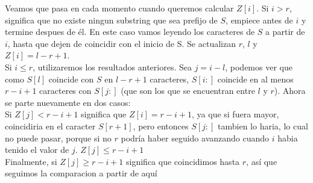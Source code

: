 \documentclass[a4paper]{article}
\begin{document}
Veamos que pasa en cada momento cuando queremos calcular $Z[i]$.
Si $i>r$, significa que no existe ningun substring que sea prefijo de $S$, empiece antes de $i$ y termine despues de \'el. En este caso vamos leyendo los caracteres de $S$ a partir de $i$, hasta que dejen de coincidir con el inicio de S. Se actualizan $r$, $l$ y $Z[i]=l-r+1$.\\
Si $i\le r$, utilizaremos los resultados anteriores. Sea $j = i-l$, podemos ver que como $S[l]$ coincide con $S$ en $l-r+1$ caracteres, $S[i:]$ coincide en al menos $r-i+1$ caracteres con $S[j:]$ (que son los que se encuentran entre $l$ y $r$). Ahora se parte nuevamente en dos casos:\\
Si $Z[j] < r-i+1$ significa que $Z[i] = r-i+1$, ya que si fuera mayor, coincidiria en el caracter $S[r+1]$, pero entonces $S[j:]$ tambien lo haria, lo cual no puede pasar, porque si no $r$ podr\'ia haber seguido avanzando cuando $i$ habia tenido el valor de $j$. $Z[j] \le r-i+1$\\
Finalmente, si $Z[j] \geq r-i+1$ significa que coincidimos hasta $r$, as\'i que seguimos la comparacion a partir de aqu\'i
\end{document}
